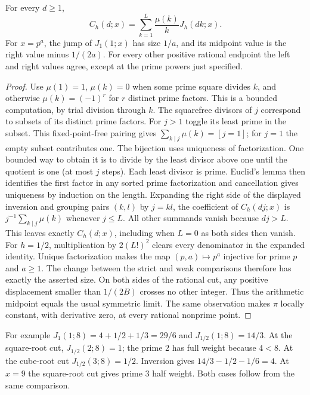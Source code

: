 \begin{theorem}
For every $d\ge1$,
\[
 C_h(d;x)=\sum_{k=1}^L \frac{\mu(k)}{k} J_h(dk;x).
\]
For $x=p^a$, the jump of $J_1(1;x)$ has size $1/a$, and its midpoint value is the right value minus $1/(2a)$. For every other positive rational endpoint the left and right values agree, except at the prime powers just specified.
\end{theorem}
\begin{proof}
Use $\mu(1)=1$, $\mu(k)=0$ when some prime square divides $k$, and otherwise $\mu(k)=(-1)^r$ for $r$ distinct prime factors. This is a bounded computation, by trial division through $k$. The squarefree divisors of $j$ correspond to subsets of its distinct prime factors. For $j>1$ toggle its least prime in the subset. This fixed-point-free pairing gives
$\sum_{k\mid j}\mu(k)=[j=1]$; for $j=1$ the empty subset contributes one. The bijection uses uniqueness of factorization. One bounded way to obtain it is to divide by the least divisor above one until the quotient is one (at most $j$ steps). Each least divisor is prime. Euclid's lemma then identifies the first factor in any sorted prime factorization and cancellation gives uniqueness by induction on the length.
Expanding the right side of the displayed inversion and grouping pairs $(k,l)$ by $j=kl$, the coefficient of $C_h(dj;x)$ is $j^{-1}\sum_{k\mid j}\mu(k)$ whenever $j\le L$. All other summands vanish because $d j>L$. This leaves exactly $C_h(d;x)$, including when $L=0$ as both sides then vanish. For $h=1/2$, multiplication by $2(L!)^2$ clears every denominator in the expanded identity.
Unique factorization makes the map $(p,a)\mapsto p^a$ injective for prime $p$ and $a\ge1$. The change between the strict and weak comparisons therefore has exactly the asserted size. On both sides of the rational cut, any positive displacement smaller than $1/(2B)$ crosses no other integer. Thus the arithmetic midpoint equals the usual symmetric limit. The same observation makes $\pi$ locally constant, with derivative zero, at every rational nonprime point.
\end{proof}

For example $J_1(1;8)=4+1/2+1/3=29/6$ and $J_{1/2}(1;8)=14/3$. At the square-root cut, $J_{1/2}(2;8)=1$; the prime $2$ has full weight because $4<8$. At the cube-root cut $J_{1/2}(3;8)=1/2$. Inversion gives $14/3-1/2-1/6=4$. At $x=9$ the square-root cut gives prime $3$ half weight. Both cases follow from the same comparison.

